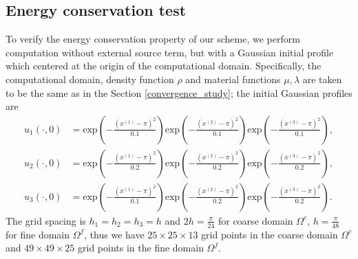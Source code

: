 \subsection{Energy conservation test}\label{conserved_energy}
To verify the energy conservation property of our scheme, we perform computation without external source term, but with a Gaussian initial profile which centered at the origin of the computational domain.  Specifically, the computational domain, density function $\rho$ and material functions $\mu, \lambda$ are taken to be the same as in the Section \ref{convergence_study}; the initial Gaussian profiles are
\begin{align*}
	u_1(\cdot,0) &= \mbox{exp}\left(-\frac{(x^{(1)}-\pi)^2}{0.1}\right)\mbox{exp}\left(-\frac{(x^{(2)}-\pi)^2}{0.1}\right)\mbox{exp}\left(-\frac{(x^{(3)}-\pi)^2}{0.1}\right),\\
	u_2(\cdot,0) &= \mbox{exp}\left(-\frac{(x^{(1)}-\pi)^2}{0.2}\right)\mbox{exp}\left(-\frac{(x^{(2)}-\pi)^2}{0.2}\right)\mbox{exp}\left(-\frac{(x^{(3)}-\pi)^2}{0.2}\right),\\
	u_3(\cdot,0) &= \mbox{exp}\left(-\frac{(x^{(1)}-\pi)^2}{0.1}\right)\mbox{exp}\left(-\frac{(x^{(2)}-\pi)^2}{0.2}\right)\mbox{exp}\left(-\frac{(x^{(3)}-\pi)^2}{0.2}\right).
\end{align*}
 The grid spacing is $h_1 = h_2 = h_3 = h$ and $2h = \frac{\pi}{24}$ for coarse domain $\Omega^c$, $h = \frac{\pi}{48}$ for fine domain $\Omega^f$, thus we have $25\times25\times13$ grid points in the coarse domain $\Omega^c$ and $49\times49\times25$ grid points in the fine domain $\Omega^f$. 

